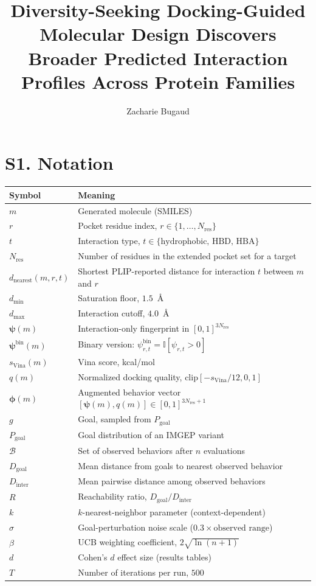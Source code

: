 \documentclass[journal=jcisd8,manuscript=suppinfo]{achemso}
\author{Zacharie Bugaud}
\affiliation{Inria, 2 rue Simone Iff, 75012 Paris, France}
\title{Diversity-Seeking Docking-Guided Molecular Design Discovers Broader Predicted Interaction Profiles Across Protein Families}
\begin{document}
\section*{S1. Notation}

\begin{longtable}{ll}
\toprule
\textbf{Symbol} & \textbf{Meaning} \\
\midrule
$m$ & Generated molecule (SMILES) \\
$r$ & Pocket residue index, $r \in \{1,\ldots,N_{\mathrm{res}}\}$ \\
$t$ & Interaction type, $t \in \{\text{hydrophobic, HBD, HBA}\}$ \\
$N_{\mathrm{res}}$ & Number of residues in the extended pocket set for a target \\
$d_{\mathrm{nearest}}(m,r,t)$ & Shortest PLIP-reported distance for interaction $t$ between $m$ and $r$ \\
$d_{\min}$ & Saturation floor, $1.5$~\AA \\
$d_{\max}$ & Interaction cutoff, $4.0$~\AA \\
$\boldsymbol{\psi}(m)$ & Interaction-only fingerprint in $[0,1]^{3N_{\mathrm{res}}}$ \\
$\boldsymbol{\psi}^{\mathrm{bin}}(m)$ & Binary version: $\psi^{\mathrm{bin}}_{r,t} = \mathbb{I}[\psi_{r,t}>0]$ \\
$s_{\mathrm{Vina}}(m)$ & Vina score, kcal/mol \\
$q(m)$ & Normalized docking quality, $\mathrm{clip}[-s_{\mathrm{Vina}}/12, 0, 1]$ \\
$\boldsymbol{\phi}(m)$ & Augmented behavior vector $[\boldsymbol{\psi}(m), q(m)] \in [0,1]^{3N_{\mathrm{res}}+1}$ \\
$g$ & Goal, sampled from $P_{\mathrm{goal}}$ \\
$P_{\mathrm{goal}}$ & Goal distribution of an IMGEP variant \\
$\mathcal{B}$ & Set of observed behaviors after $n$ evaluations \\
$D_{\mathrm{goal}}$ & Mean distance from goals to nearest observed behavior \\
$D_{\mathrm{inter}}$ & Mean pairwise distance among observed behaviors \\
$R$ & Reachability ratio, $D_{\mathrm{goal}}/D_{\mathrm{inter}}$ \\
$k$ & $k$-nearest-neighbor parameter (context-dependent) \\
$\sigma$ & Goal-perturbation noise scale ($0.3 \times \text{observed range}$) \\
$\beta$ & UCB weighting coefficient, $2\sqrt{\ln(n+1)}$ \\
$d$ & Cohen's $d$ effect size (results tables) \\
$T$ & Number of iterations per run, $500$ \\
\bottomrule
\end{longtable}
\end{document}
